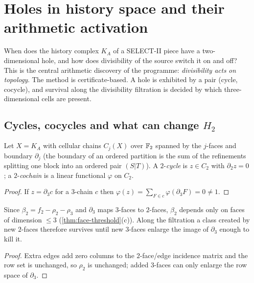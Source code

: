 \chapter{Holes in history space and their arithmetic activation}\label{ch:topology}

When does the history complex $K_A$ of a SELECT-II piece have a two-dimensional hole, and how does divisibility of the source switch it on and off? This is the central arithmetic discovery of the programme: \emph{divisibility acts on topology}. The method is certificate-based. A hole is exhibited by a pair (cycle, cocycle), and survival along the divisibility filtration is decided by which three-dimensional cells are present.

\section{Cycles, cocycles and what can change \texorpdfstring{$H_2$}{H2}}
Let $X=K_A$ with cellular chains $C_j(X)$ over $\mathbb{F}_2$ spanned by the $j$-faces and boundary $\partial_j$ (the boundary of an ordered partition is the sum of the refinements splitting one block into an ordered pair $(S|T)$). A $2$-\emph{cycle} is $z\in C_2$ with $\partial_2z=0$; a $2$-\emph{cochain} is a linear functional $\varphi$ on $C_2$.
\begin{proof}
If $z=\partial_3c$ for a $3$-chain $c$ then $\varphi(z)=\sum_{F\in c}\varphi(\partial_3F)=0\ne1$.
\end{proof}
Since $\beta_2=f_2-\rho_2-\rho_3$ and $\partial_3$ maps $3$-faces to $2$-faces, $\beta_2$ depends only on faces of dimension $\le3$ (\cref{thm:face-threshold}(c)). Along the filtration a class created by new $2$-faces therefore survives until new $3$-faces enlarge the image of $\partial_3$ enough to kill it.
\begin{proof}
Extra edges add zero columns to the $2$-face/edge incidence matrix and the row set is unchanged, so $\rho_2$ is unchanged; added $3$-faces can only enlarge the row space of $\partial_3$.
\end{proof}

